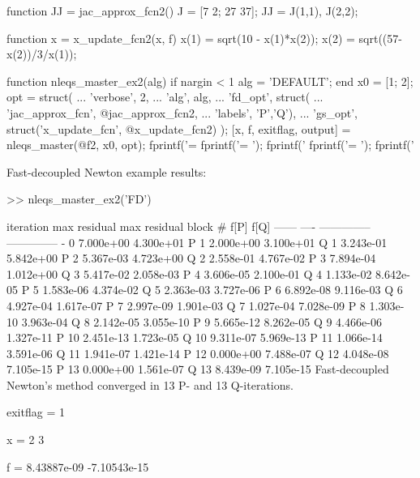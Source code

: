 \documentclass[12pt]{article}
\numberwithin{equation}{section}
\numberwithin{table}{section}
\numberwithin{figure}{section}
\begin{document}
\begin{Code}
function JJ = jac_approx_fcn2()
J = [7 2; 27 37];
JJ = {J(1,1), J(2,2)};
\end{Code}

\begin{Code}
function x = x_update_fcn2(x, f)
x(1) = sqrt(10 - x(1)*x(2));
x(2) = sqrt((57-x(2))/3/x(1));
\end{Code}

\begin{Code}
function nleqs_master_ex2(alg)
if nargin < 1
    alg = 'DEFAULT';
end
x0 = [1; 2];
opt = struct( ...
    'verbose', 2, ...
    'alg', alg, ...
    'fd_opt', struct( ...
        'jac_approx_fcn', @jac_approx_fcn2, ...
        'labels', {{'P','Q'}}), ...
    'gs_opt', struct('x_update_fcn', @x_update_fcn2) );
[x, f, exitflag, output] = nleqs_master(@f2, x0, opt);
fprintf('\nexitflag = %
fprintf('\nx = \n');
fprintf('   %
fprintf('\nf = \n');
fprintf('   %
\end{Code}

\clearpage
\noindent Fast-decoupled Newton example results:
\begin{Code}
>> nleqs_master_ex2('FD')    

 iteration    max residual    max residual 
block    #        f[P]            f[Q]     
------ ----  --------------  --------------
  -      0       7.000e+00       4.300e+01
  P      1       2.000e+00       3.100e+01
  Q      1       3.243e-01       5.842e+00
  P      2       5.367e-03       4.723e+00
  Q      2       2.558e-01       4.767e-02
  P      3       7.894e-04       1.012e+00
  Q      3       5.417e-02       2.058e-03
  P      4       3.606e-05       2.100e-01
  Q      4       1.133e-02       8.642e-05
  P      5       1.583e-06       4.374e-02
  Q      5       2.363e-03       3.727e-06
  P      6       6.892e-08       9.116e-03
  Q      6       4.927e-04       1.617e-07
  P      7       2.997e-09       1.901e-03
  Q      7       1.027e-04       7.028e-09
  P      8       1.303e-10       3.963e-04
  Q      8       2.142e-05       3.055e-10
  P      9       5.665e-12       8.262e-05
  Q      9       4.466e-06       1.327e-11
  P     10       2.451e-13       1.723e-05
  Q     10       9.311e-07       5.969e-13
  P     11       1.066e-14       3.591e-06
  Q     11       1.941e-07       1.421e-14
  P     12       0.000e+00       7.488e-07
  Q     12       4.048e-08       7.105e-15
  P     13       0.000e+00       1.561e-07
  Q     13       8.439e-09       7.105e-15
Fast-decoupled Newton's method converged in 13 P- and 13 Q-iterations.

exitflag = 1

x = 
    2
    3

f = 
    8.43887e-09
   -7.10543e-15
\end{Code}
\end{document}
